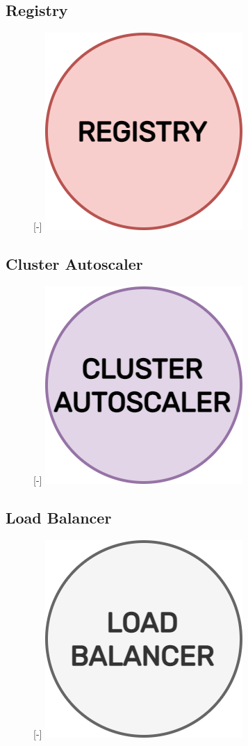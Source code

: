 \subsection{Registry}
\label{subsec:architecture_components_registry}

\begin{figure} %
  \raisebox{0pt}[\dimexpr\height-\baselineskip\relax]{\centering
  \includegraphics[width=.2\textwidth]{images/recluster/registry.png}}
\end{figure}

\subsection{Cluster Autoscaler}
\label{subsec:architecture_components_cluster_autoscaler}

\begin{figure} %
  \raisebox{0pt}[\dimexpr\height-\baselineskip\relax]{\centering
  \includegraphics[width=.2\textwidth]{images/recluster/cluster_autoscaler.png}}
\end{figure}

\subsection{Load Balancer}
\label{subsec:architecture_components_load_balancer}

\begin{figure} %
  \raisebox{0pt}[\dimexpr\height-\baselineskip\relax]{\centering
  \includegraphics[width=.2\textwidth]{images/recluster/load_balancer.png}}
\end{figure}

